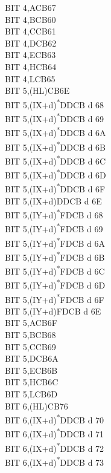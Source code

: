 \documentclass[twoside,openright,a4paper]{book}
\begin{document}
\begin{multicols}{3}
{\begin{tabbing}
	BIT 4,A\>CB67\\
	BIT 4,B\>CB60\\
	BIT 4,C\>CB61\\
	BIT 4,D\>CB62\\
	BIT 4,E\>CB63\\
	BIT 4,H\>CB64\\
	BIT 4,L\>CB65\\
	BIT 5,(HL)\>CB6E\\
	BIT 5,(IX+d)\textsuperscript{*}\>DDCB d 68\\
	BIT 5,(IX+d)\textsuperscript{*}\>DDCB d 69\\
	BIT 5,(IX+d)\textsuperscript{*}\>DDCB d 6A\\
	BIT 5,(IX+d)\textsuperscript{*}\>DDCB d 6B\\
	BIT 5,(IX+d)\textsuperscript{*}\>DDCB d 6C\\
	BIT 5,(IX+d)\textsuperscript{*}\>DDCB d 6D\\
	BIT 5,(IX+d)\textsuperscript{*}\>DDCB d 6F\\
	BIT 5,(IX+d)\>DDCB d 6E\\
	BIT 5,(IY+d)\textsuperscript{*}\>FDCB d 68\\
	BIT 5,(IY+d)\textsuperscript{*}\>FDCB d 69\\
	BIT 5,(IY+d)\textsuperscript{*}\>FDCB d 6A\\
	BIT 5,(IY+d)\textsuperscript{*}\>FDCB d 6B\\
	BIT 5,(IY+d)\textsuperscript{*}\>FDCB d 6C\\
	BIT 5,(IY+d)\textsuperscript{*}\>FDCB d 6D\\
	BIT 5,(IY+d)\textsuperscript{*}\>FDCB d 6F\\
	BIT 5,(IY+d)\>FDCB d 6E\\
	BIT 5,A\>CB6F\\
	BIT 5,B\>CB68\\
	BIT 5,C\>CB69\\
	BIT 5,D\>CB6A\\
	BIT 5,E\>CB6B\\
	BIT 5,H\>CB6C\\
	BIT 5,L\>CB6D\\
	BIT 6,(HL)\>CB76\\
	BIT 6,(IX+d)\textsuperscript{*}\>DDCB d 70\\
	BIT 6,(IX+d)\textsuperscript{*}\>DDCB d 71\\
	BIT 6,(IX+d)\textsuperscript{*}\>DDCB d 72\\
	BIT 6,(IX+d)\textsuperscript{*}\>DDCB d 73\\

\end{tabbing}}
\end{multicols}
\end{document}
